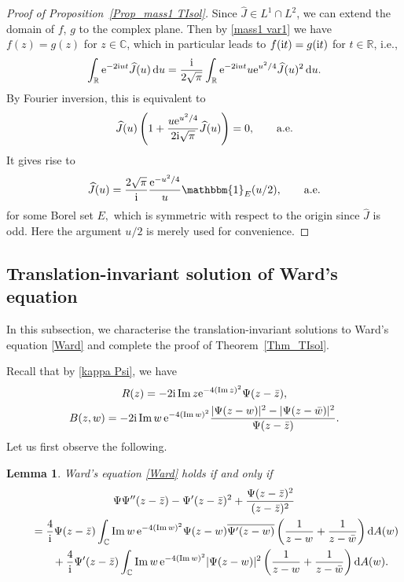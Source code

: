 \documentclass[pdftex]{sigma}
\numberwithin{equation}{section}
\newtheorem{Lemma}[Theorem]{Lemma}
\newcommand{\R}{{\mathbb R}}
\newcommand{\C}{{\mathbb C}}
\newcommand{\im}{\operatorname{Im}}
\newcommand{\1}{\chi}
\def\wh{\widehat}
\begin{document}
\begin{proof}[Proof of Proposition~\ref{Prop_mass1 TIsol}]
	Since $\wh{J} \in L^1 \cap L^2$, we can extend the domain of $f$, $g$ to the complex plane. Then by \eqref{mass1 var1} we have $f(z)=g(z)$ for $z\in\C$, which in particular leads to $f({\rm i}t)=g({\rm i}t)$ for $t \in \R$, i.e.,
	\begin{gather*}
		\int_{\R} {\rm e}^{-2{\rm i}ut} \wh{J}(u)\,{\rm d}u=\frac{{\rm i}}{2\sqrt{\pi} } \int_{ \R } {\rm e}^{-2{\rm i}ut} u {\rm e}^{u^2/4} \wh{J}(u)^2\,{\rm d}u.
	\end{gather*}
	By Fourier inversion, this is equivalent to
	\begin{gather*}
		\wh{J}(u)\left( 1+\frac{u {\rm e}^{u^2/4}}{2{\rm i}\sqrt{\pi} } \wh{J}(u) \right)=0,\qquad \text{a.e.}
	\end{gather*}
It gives rise to
	\begin{gather*}
		\wh{J}(u)=\frac{2\sqrt{\pi}}{{\rm i}} \frac{{\rm e}^{-u^2/4}}{u}\mathbbm{1}_{E}(u/2), \qquad \text{a.e.}
	\end{gather*}
	for some Borel set $E,$ which is symmetric with respect to the origin since $\wh{J}$ is odd. Here the argument $u/2$ is merely used for convenience.
\end{proof}


\subsection{Translation-invariant solution of Ward's equation}
In this subsection, we characterise the translation-invariant solutions to Ward's equation \eqref{Ward} and complete the proof of Theorem~\ref{Thm_TIsol}.

Recall that by \eqref{kappa Psi}, we have
\begin{gather*}
R(z) =-2{\rm i} \im z {\rm e}^{-4 (\im z)^2} \Psi(z-\bar{z}),
\\
B(z,w) =-2{\rm i} \im w\, {\rm e}^{ -4(\im w)^2 } \frac{ |\Psi(z-w)|^2-|\Psi(z-\bar{w})|^2 }{ \Psi(z-\bar{z})}.
\end{gather*}
Let us first observe the following.

\begin{Lemma}\label{Lem_Ward var1}
	Ward's equation \eqref{Ward} holds if and only if
	\begin{gather*}
 \Psi \Psi''(z-\bar{z}) - \Psi'(z-\bar{z})^2+\dfrac{\Psi(z-\bar{z})^2}{(z-\bar{z})^2}
			\\
\qquad{} = \frac{4}{{\rm i}} \Psi(z-\bar{z})\int_\C \im w\, {\rm e}^{ -4(\im w)^2 } \Psi(z-w) \overline{ \Psi'(z-w) } \left( \frac{1}{z-w}+\frac{1}{z-\bar{w}} \right) {\rm d}A(w)
			\\
\qquad\quad{} + \frac{4}{{\rm i}} \Psi'(z-\bar{z}) \int_\C \im w\, {\rm e}^{ -4(\im w)^2 } |\Psi(z-w)|^2 \left( \frac{1}{z-w}+\frac{1}{z-\bar{w}} \right) {\rm d}A(w).
		\end{gather*}
\end{Lemma}
\end{document}
